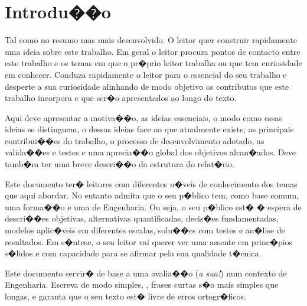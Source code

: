 



\chapter{Introdu��o}
\label{ch:introducao}

Tal como no resumo mas mais desenvolvido. O leitor quer construir rapidamente uma ideia sobre este trabalho. Em geral o leitor procura pontos de contacto entre este trabalho e os temas em que o pr�prio leitor trabalha ou que tem curiosidade em conhecer.  Conduza rapidamente o leitor para o essencial do seu trabalho e desperte a sua curiosidade alinhando de modo objetivo os contributos que este trabalho incorpora e que ser�o apresentados ao longo do texto.

Aqui deve apresentar a motiva��o, as ideias essenciais, o modo como essas ideias se distinguem, o  dessas ideias face ao que atualmente existe, as principais contribui��es do trabalho, o processo de desenvolvimento adotado, as valida��es e testes e uma aprecia��o global dos objetivos alcan�ados. Deve tamb�m ter uma breve descri��o da estrutura do relat�rio.

Este documento ter� leitores com diferentes n�veis de conhecimento dos temas que aqui abordar. No entanto admita que o seu p�blico tem, como base comum, uma forma��o e uma  de Engenharia. Ou seja, o seu p�blico est� � espera de descri��es objetivas, alternativas quantificadas, decis�es fundamentadas, modelos aplic�veis em diferentes escalas, solu��es com testes e an�lise de resultados. Em s�ntese, o seu leitor vai querer ver uma  assente em princ�pios s�lidos e com capacidade para se afirmar pela sua qualidade t�cnica.

Este documento servir� de base a uma avalia��o (\textit{a sua!}) num contexto de Engenharia. Escreva de modo simples, \eg, frases curtas s�o mais simples que longas, e garanta que o seu texto est� livre de erros ortogr�ficos.

